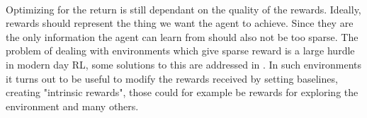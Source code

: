 \noindent
\\ Optimizing for the return is still dependant on the quality of the rewards. Ideally, rewards should represent the thing we want the agent to achieve. Since they are the only information the agent can learn from should also not be too sparse. The problem of dealing with environments which give sparse reward is a large hurdle in modern day RL, some solutions to this are addressed in . In such environments it turns out to be useful to modify the rewards received by setting baselines, creating "intrinsic rewards", those could for example be rewards for exploring the environment and many others. 



